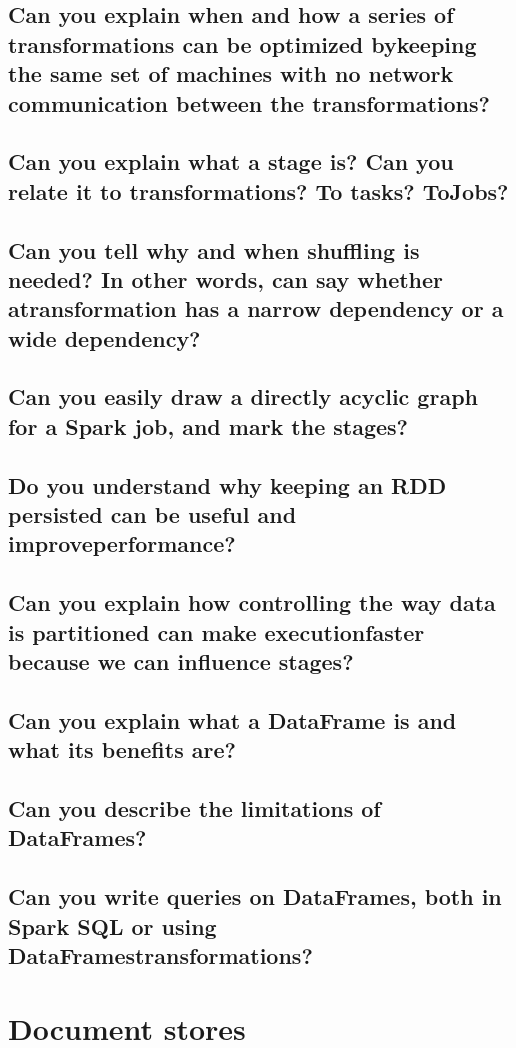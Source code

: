 \documentclass{article}
\begin{document}
\subsection{Can you explain when and how a series of transformations can be optimized bykeeping the same set of machines with no network communication between the transformations?}
\subsection{Can you explain what a stage is? Can you relate it to transformations? To tasks? ToJobs?}
\subsection{Can you tell why and when shuffling is needed? In other words, can say whether atransformation has a narrow dependency or a wide dependency?}
\subsection{Can you easily draw a directly acyclic graph for a Spark job, and mark the stages?}
\subsection{Do you understand why keeping an RDD persisted can be useful and improveperformance?}
\subsection{Can you explain how controlling the way data is partitioned can make executionfaster because we can influence stages?}
\subsection{Can you explain what a DataFrame is and what its benefits are?}
\subsection{Can you describe the limitations of DataFrames?}
\subsection{Can you write queries on DataFrames, both in Spark SQL or using DataFramestransformations?}

\pagebreak

\section{Document stores}
\end{document}
